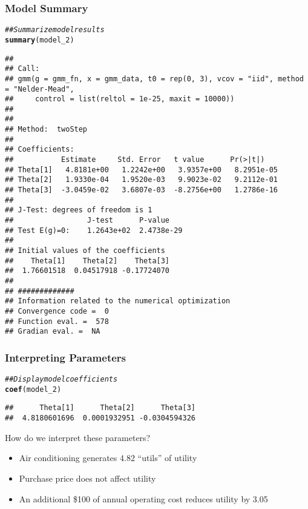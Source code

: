 \documentclass{beamer}\usepackage[]{graphicx}\usepackage[]{xcolor}
\makeatletter
\newcommand{\hlcom}[1]{\textcolor[rgb]{0.678,0.584,0.686}{\textit{#1}}}%
\newcommand{\hlstd}[1]{\textcolor[rgb]{0.345,0.345,0.345}{#1}}%
\newcommand{\hlkwd}[1]{\textcolor[rgb]{0.737,0.353,0.396}{\textbf{#1}}}%
\newenvironment{kframe}{%
 \def\at@end@of@kframe{}%
 \ifinner\ifhmode%
  \def\at@end@of@kframe{\end{minipage}}%
  \begin{minipage}{\columnwidth}%
 \fi\fi%
 \def\FrameCommand##1{\hskip\@totalleftmargin \hskip-\fboxsep
 \colorbox{shadecolor}{##1}\hskip-\fboxsep
     \hskip-\linewidth \hskip-\@totalleftmargin \hskip\columnwidth}%
 \MakeFramed {\advance\hsize-\width
   \@totalleftmargin\z@ \linewidth\hsize
   \@setminipage}}%
 {\par\unskip\endMakeFramed%
 \at@end@of@kframe}
\newenvironment{knitrout}{}{} %
\makeatother
\begin{document}
\begin{frame}[fragile]\frametitle{Model Summary}
\begin{knitrout}\tiny
{}\color{fgcolor}\begin{kframe}
\begin{alltt}
\hlcom{## Summarize model results}
\hlkwd{summary}\hlstd{(model_2)}
\end{alltt}
\begin{verbatim}
## 
## Call:
## gmm(g = gmm_fn, x = gmm_data, t0 = rep(0, 3), vcov = "iid", method = "Nelder-Mead", 
##     control = list(reltol = 1e-25, maxit = 10000))
## 
## 
## Method:  twoStep 
## 
## Coefficients:
##           Estimate     Std. Error   t value      Pr(>|t|)   
## Theta[1]   4.8181e+00   1.2242e+00   3.9357e+00   8.2951e-05
## Theta[2]   1.9330e-04   1.9520e-03   9.9023e-02   9.2112e-01
## Theta[3]  -3.0459e-02   3.6807e-03  -8.2756e+00   1.2786e-16
## 
## J-Test: degrees of freedom is 1 
##                 J-test      P-value   
## Test E(g)=0:    1.2643e+02  2.4738e-29
## 
## Initial values of the coefficients
##    Theta[1]    Theta[2]    Theta[3] 
##  1.76601518  0.04517918 -0.17724070 
## 
## #############
## Information related to the numerical optimization
## Convergence code =  0 
## Function eval. =  578 
## Gradian eval. =  NA
\end{verbatim}
\end{kframe}
\end{knitrout}
\end{frame}

\begin{frame}[fragile]\frametitle{Interpreting Parameters}
\begin{knitrout}\footnotesize
{}\color{fgcolor}\begin{kframe}
\begin{alltt}
\hlcom{## Display model coefficients}
\hlkwd{coef}\hlstd{(model_2)}
\end{alltt}
\begin{verbatim}
##      Theta[1]      Theta[2]      Theta[3] 
##  4.8180601696  0.0001932951 -0.0304594326
\end{verbatim}
\end{kframe}
\end{knitrout}
    \vspace{2ex}
    How do we interpret these parameters?
    \begin{itemize}
        \item Air conditioning generates 4.82 ``utils'' of utility
        \item Purchase price does not affect utility
        \item An additional \$100 of annual operating cost reduces utility by 3.05
    \end{itemize}
\end{frame}
\end{document}
